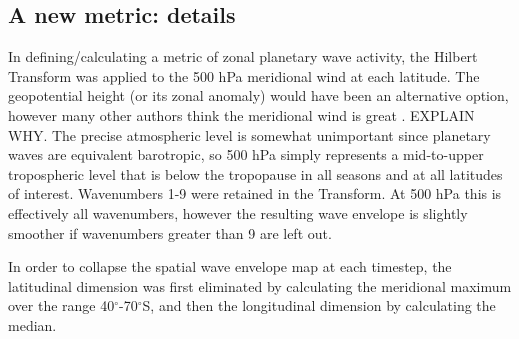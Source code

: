 \subsection{A new metric: details}

In defining/calculating a metric of zonal planetary wave activity, the Hilbert Transform was applied to the 500 hPa meridional wind at each latitude. The geopotential height (or its zonal anomaly) would have been an alternative option, however many other authors think the meridional wind is great \citep[e.g.][p.365]{Hope2014}. EXPLAIN WHY. The precise atmospheric level is somewhat unimportant since planetary waves are equivalent barotropic, so 500 hPa simply represents a mid-to-upper tropospheric level that is below the tropopause in all seasons and at all latitudes of interest. Wavenumbers 1-9 were retained in the Transform. At 500 hPa this is effectively all wavenumbers, however the resulting wave envelope is slightly smoother if wavenumbers greater than 9 are left out.

In order to collapse the spatial wave envelope map at each timestep, the latitudinal dimension was first eliminated by calculating the meridional maximum over the range 40$^{\circ}$-70$^{\circ}$S, and then the longitudinal dimension by calculating the median.

